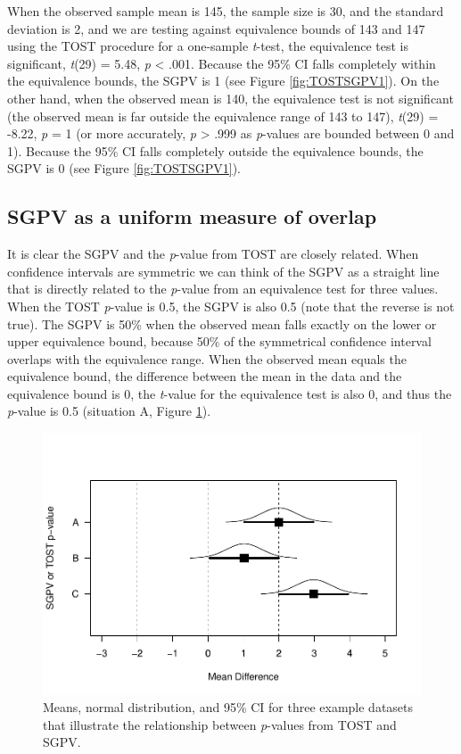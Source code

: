 \documentclass[,man,floatsintext]{apa6}
\begin{document}
When the observed sample mean is 145, the sample size is 30, and the
standard deviation is 2, and we are testing against equivalence bounds
of 143 and 147 using the TOST procedure for a one-sample \emph{t}-test,
the equivalence test is significant, \emph{t}(29) = 5.48, \emph{p}
\textless{} .001. Because the 95\% CI falls completely within the
equivalence bounds, the SGPV is 1 (see Figure \ref{fig:TOSTSGPV1}). On
the other hand, when the observed mean is 140, the equivalence test is
not significant (the observed mean is far outside the equivalence range
of 143 to 147), \emph{t}(29) = -8.22, \emph{p} = 1 (or more accurately,
\emph{p} \textgreater{} .999 as \emph{p}-values are bounded between 0
and 1). Because the 95\% CI falls completely outside the equivalence
bounds, the SGPV is 0 (see Figure \ref{fig:TOSTSGPV1}).

\subsection{SGPV as a uniform measure of
overlap}\label{sgpv-as-a-uniform-measure-of-overlap}

It is clear the SGPV and the \emph{p}-value from TOST are closely
related. When confidence intervals are symmetric we can think of the
SGPV as a straight line that is directly related to the \emph{p}-value
from an equivalence test for three values. When the TOST \emph{p}-value
is 0.5, the SGPV is also 0.5 (note that the reverse is not true). The
SGPV is 50\% when the observed mean falls exactly on the lower or upper
equivalence bound, because 50\% of the symmetrical confidence interval
overlaps with the equivalence range. When the observed mean equals the
equivalence bound, the difference between the mean in the data and the
equivalence bound is 0, the \emph{t}-value for the equivalence test is
also 0, and thus the \emph{p}-value is 0.5 (situation A, Figure
\ref{fig:TOSTSGPV3}).

\begin{figure}
\centering
\includegraphics{manuscript.R1_files/figure-latex/TOSTSGPV3-1.pdf}
\caption{\label{fig:TOSTSGPV3}Means, normal distribution, and 95\% CI for
three example datasets that illustrate the relationship between
\emph{p}-values from TOST and SGPV.}
\end{figure}
\end{document}
